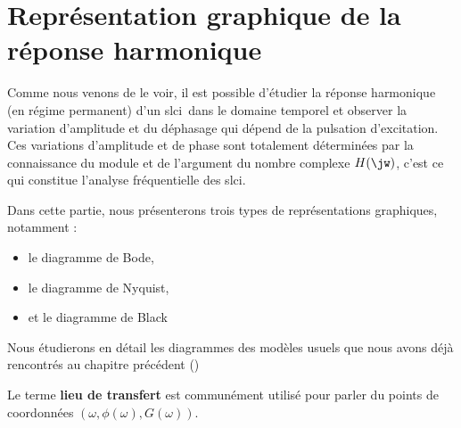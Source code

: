 \section[Représentation graphique]{Représentation graphique de 
la réponse harmonique}
Comme nous venons de le voir, il est possible d'étudier
la réponse harmonique (en régime permanent) d'un \gls{slci}~dans le domaine 
temporel et observer la variation d'amplitude et du 
déphasage qui dépend de la pulsation d'excitation. Ces variations 
d'amplitude et de phase sont totalement déterminées par la 
connaissance du module et de l'argument du nombre complexe $H(\jw)$, 
c'est ce qui constitue l'analyse fréquentielle des \gls{slci}.

Dans cette partie, nous présenterons trois types de représentations graphiques, 
notamment :
\begin{itemize}
    \item le diagramme de Bode,
    \item le diagramme de Nyquist,
    \item et le diagramme de Black
\end{itemize}
Nous étudierons en détail les diagrammes des modèles usuels que nous 
avons déjà rencontrés au chapitre précédent ()

Le terme \textbf{lieu de transfert} est communément utilisé pour parler du 
points de coordonnées $(\omega, \phi(\omega),G(\omega))$.
